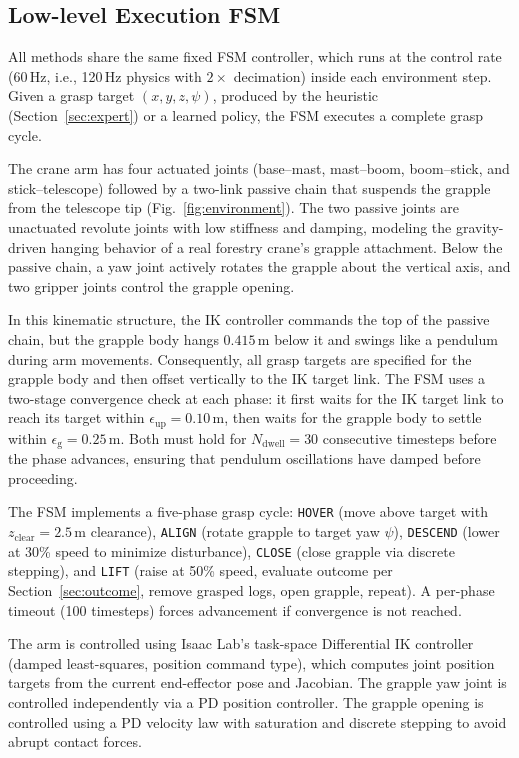 \documentclass[letterpaper, 10 pt, conference]{ieeeconf}
\begin{document}
\subsection{Low-level Execution FSM}
All methods share the same fixed FSM controller, which runs at the control rate (60\,Hz, i.e., 120\,Hz physics with $2\times$ decimation) inside each environment step.
Given a grasp target $(x,y,z,\psi)$, produced by the heuristic (Section~\ref{sec:expert}) or a learned policy, the FSM executes a complete grasp cycle.

The crane arm has four actuated joints (base--mast, mast--boom, boom--stick, and stick--telescope) followed by a two-link passive chain that suspends the grapple from the telescope tip (Fig.~\ref{fig:environment}).
The two passive joints are unactuated revolute joints with low stiffness and damping, modeling the gravity-driven hanging behavior of a real forestry crane's grapple attachment.
Below the passive chain, a yaw joint actively rotates the grapple about the vertical axis, and two gripper joints control the grapple opening.

In this kinematic structure, the IK controller commands the top of the passive chain, but the grapple body hangs $0.415$\,m below it and swings like a pendulum during arm movements.
Consequently, all grasp targets are specified for the grapple body and then offset vertically to the IK target link.
The FSM uses a two-stage convergence check at each phase: it first waits for the IK target link to reach its target within $\epsilon_{\text{up}} = 0.10$\,m, then waits for the grapple body to settle within $\epsilon_{\text{g}} = 0.25$\,m.
Both must hold for $N_{\text{dwell}} = 30$ consecutive timesteps before the phase advances, ensuring that pendulum oscillations have damped before proceeding.

The FSM implements a five-phase grasp cycle: \texttt{HOVER} (move above target with $z_{\text{clear}} = 2.5$\,m clearance), \texttt{ALIGN} (rotate grapple to target yaw $\psi$), \texttt{DESCEND} (lower at 30\% speed to minimize disturbance), \texttt{CLOSE} (close grapple via discrete stepping), and \texttt{LIFT} (raise at 50\% speed, evaluate outcome per Section~\ref{sec:outcome}, remove grasped logs, open grapple, repeat).
A per-phase timeout (100 timesteps) forces advancement if convergence is not reached.

The arm is controlled using Isaac Lab's task-space Differential IK controller~\cite{mittal2025isaaclab} (damped least-squares, position command type), which computes joint position targets from the current end-effector pose and Jacobian.
The grapple yaw joint is controlled independently via a PD position controller.
The grapple opening is controlled using a PD velocity law with saturation and discrete stepping to avoid abrupt contact forces.
\end{document}
